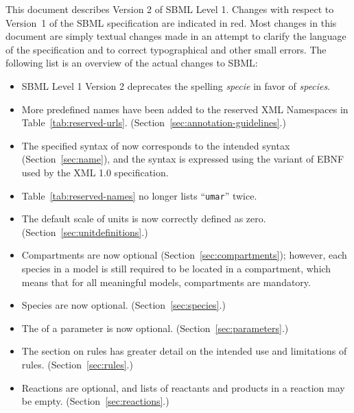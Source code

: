 \documentclass[10pt]{cekarticle}
\newcommand{\vref}[1]{\ref{#1}}
\newenvironment{blockChanged}{\color{BrickRed}}{}
\begin{document}
\begin{blockChanged}
  This document describes Version 2 of SBML Level 1.  Changes with respect
  to Version~1 of the SBML specification are indicated in red.  Most
  changes in this document are simply textual changes made in an attempt to
  clarify the language of the specification and to correct typographical
  and other small errors.  The following list is an overview of the actual
  changes to SBML:
\vspace*{-1ex}\begin{itemize}\setlength{\parskip}{0.27ex}
  
\item SBML Level 1 Version 2 deprecates the spelling \emph{specie} 
  in favor of \emph{species}.
  
\item More predefined names have been added to the reserved XML Namespaces
      in Table~\ref{tab:reserved-urls}. (Section~\ref{sec:annotation-guidelines}.)

\item The specified syntax of  now corresponds to the intended
  syntax (Section~\ref{sec:name}), and the syntax is expressed using the
  variant of EBNF used by the XML 1.0 specification.

\item Table~\vref{tab:reserved-names} no longer lists ``\texttt{umar}'' twice.

\item The default scale of units is now correctly defined as zero.
  (Section~\ref{sec:unitdefinitions}.)
  
\item Compartments are now optional (Section~\ref{sec:compartments});
  however, each species in a model is still required to be located in a
  compartment, which means that for all meaningful models, compartments are
  mandatory.

\item Species are now optional.  (Section~\ref{sec:species}.)

\item The  of a parameter is now optional.
  (Section~\ref{sec:parameters}.)
  
\item The section on rules has greater detail on the intended use and
  limitations of rules.  (Section~\ref{sec:rules}.)
  
\item Reactions are optional, and lists of reactants and products in a
  reaction may be empty.  (Section~\ref{sec:reactions}.)
  

\end{itemize}
\end{blockChanged}
\end{document}
